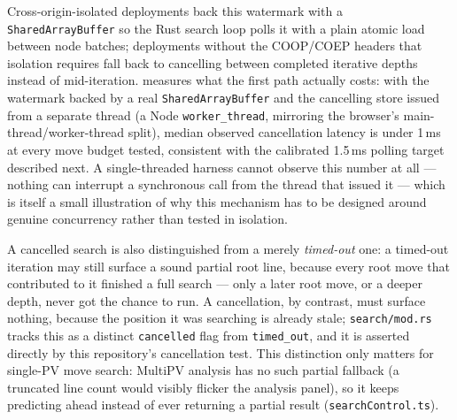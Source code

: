 \documentclass[10pt,twocolumn]{article}
\newcommand{\code}[1]{\texttt{#1}}
\begin{document}
Cross-origin-isolated deployments back this watermark with a
\code{SharedArrayBuffer} so the Rust search loop polls it with a plain
atomic load between node batches; deployments without the COOP/COEP headers
that isolation requires fall back to cancelling between completed iterative
depths instead of mid-iteration.  measures what the
first path actually costs: with the watermark backed by a real
\code{SharedArrayBuffer} and the cancelling store issued from a separate
thread (a Node \code{worker\_thread}, mirroring the browser's
main-thread/worker-thread split), median observed cancellation latency is
under 1\,ms at every move budget tested, consistent with the calibrated
1.5\,ms polling target described next. A single-threaded harness cannot
observe this number at all --- nothing can interrupt a synchronous call from
the thread that issued it --- which is itself a small illustration of why
this mechanism has to be designed around genuine concurrency rather than
tested in isolation.

\begin{table}[t]
\centering
\small
\caption{Cancellation latency: time from an \code{Atomics.store} on the
watermark, issued from a separate thread mid-search, to the search returning.
20 samples per budget; the store fires roughly a third of the way through
the budget.}
\label{tab:cancellation}
\end{table}

A cancelled search is also distinguished from a merely \emph{timed-out} one:
a timed-out iteration may still surface a sound partial root line, because
every root move that contributed to it finished a full search --- only a
later root move, or a deeper depth, never got the chance to run.  A
cancellation, by contrast, must surface nothing, because the position it was
searching is already stale; \code{search/mod.rs} tracks this as a distinct
\code{cancelled} flag from \code{timed\_out}, and it is asserted directly by
this repository's cancellation test. This distinction only matters for
single-PV move search: MultiPV analysis has no such partial fallback (a
truncated line count would visibly flicker the analysis panel), so it keeps
predicting ahead instead of ever returning a partial result
(\code{searchControl.ts}).
\end{document}
